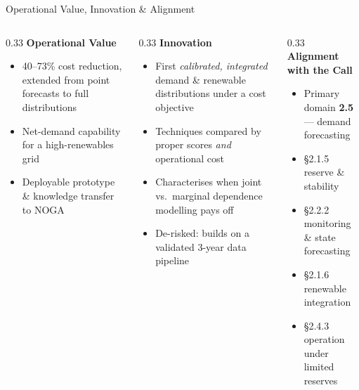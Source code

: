 \documentclass[aspectratio=169]{beamer}
\begin{document}
\begin{frame}{Operational Value, Innovation \& Alignment}
  \centering
  \begin{columns}[T,onlytextwidth]

    \begin{column}{0.33\textwidth}
      \centering
      {\bfseries\color{nogablue} Operational Value}\\[0.6em]
      \begin{itemize}[leftmargin=1.2em,itemsep=0.5em]
        \footnotesize
        \item 40--73\% cost reduction, extended from point forecasts to full distributions
        \item Net-demand capability for a high-renewables grid
        \item Deployable prototype \& knowledge transfer to NOGA
      \end{itemize}
    \end{column}

    \begin{column}{0.33\textwidth}
      \centering
      {\bfseries\color{riskpurple} Innovation}\\[0.6em]
      \begin{itemize}[leftmargin=1.2em,itemsep=0.5em]
        \footnotesize
        \item First \emph{calibrated, integrated} demand \& renewable distributions under a cost objective
        \item Techniques compared by proper scores \emph{and} operational cost
        \item Characterises when joint vs.\ marginal dependence modelling pays off
        \item De-risked: builds on a validated 3-year data pipeline
      \end{itemize}
    \end{column}

    \begin{column}{0.33\textwidth}
      \centering
      {\bfseries\color{netorange} Alignment with the Call}\\[0.6em]
      \begin{itemize}[leftmargin=1.2em,itemsep=0.5em]
        \footnotesize
        \item Primary domain \textbf{2.5} --- demand forecasting
        \item \S2.1.5 reserve \& stability
        \item \S2.2.2 monitoring \& state forecasting
        \item \S2.1.6 renewable integration
        \item \S2.4.3 operation under limited reserves
      \end{itemize}
    \end{column}


\end{columns}
\end{frame}
\end{document}

